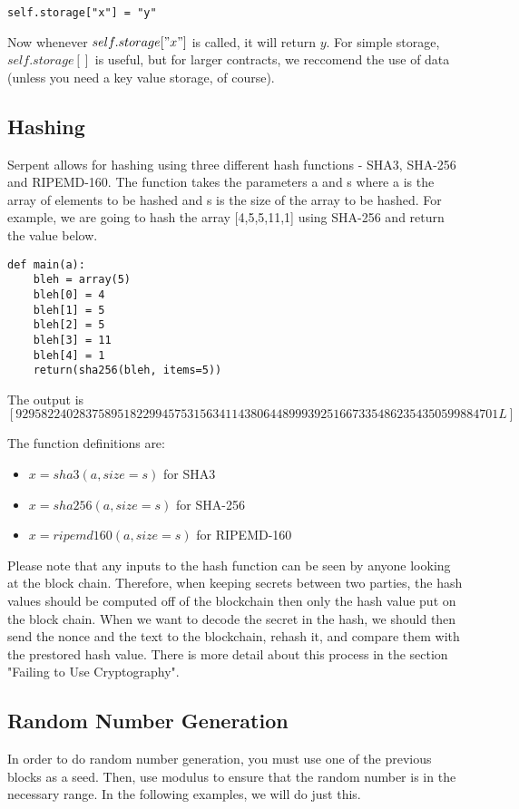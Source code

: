 \documentclass[12pt]{article}
\begin{document}
\begin{verbatim}
self.storage["x"] = "y"
\end{verbatim}

Now whenever $self.storage["x"]$ is called, it will return $y$. For simple storage, $self.storage[]$ is useful, but for larger contracts, we reccomend the use of data (unless you need a key value storage, of course). \cite{Serpent, Serpent1.0(old)}

\subsection{Hashing}
Serpent allows for hashing using three different hash functions - SHA3, SHA-256 and RIPEMD-160. The function takes the parameters a and s where a is the array of elements to be hashed and s is the size of the array to be hashed. For example, we are going to hash the array [4,5,5,11,1] using SHA-256 and return the value below. \cite{Serpent}

\begin{verbatim}
def main(a):
	bleh = array(5)
	bleh[0] = 4
	bleh[1] = 5
	bleh[2] = 5
	bleh[3] = 11
	bleh[4] = 1
	return(sha256(bleh, items=5))
\end{verbatim}
The output is $[9295822402837589518229945753156341143806448999392516673354862354350599884701L]$

The function definitions are:
\begin{itemize}
	\item $x = sha3(a, size=s)$ for SHA3
	\item $x = sha256(a, size=s)$ for SHA-256
	\item $x = ripemd160(a, size=s)$ for RIPEMD-160
\end{itemize}

Please note that any inputs to the hash function can be seen by anyone looking at the block chain. Therefore, when keeping secrets between two parties, the hash values should be computed off of the blockchain then only the hash value put on the block chain. When we want to decode the secret in the hash, we should then send the nonce and the text to the blockchain, rehash it, and compare them with the prestored hash value. There is more detail about this process in the section "Failing to Use Cryptography".

\subsection{Random Number Generation}
In order to do random number generation, you must use one of the previous blocks as a seed. Then, use modulus to ensure that the random number is in the necessary range. In the following examples, we will do just this.
\end{document}
